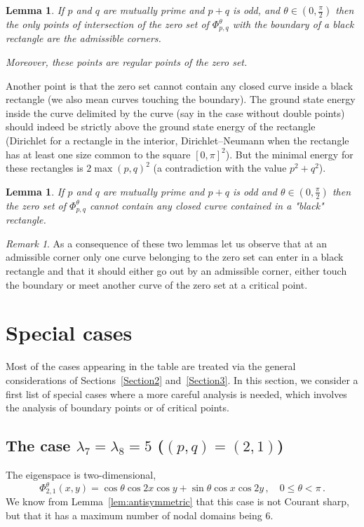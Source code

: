 \documentclass[a4paper,reqno,11pt]{amsart}
\newtheorem{lemma}[thm]{Lemma}
\theoremstyle{remark}
\newtheorem{remark}[thm]{Remark}
\theoremstyle{definition}
\numberwithin{equation}{section}
\begin{document}
\begin{lemma}
\label{lemma5.6}
If $p$ and $q$ are mutually prime and $p+q$ is odd, and 
$\theta \in (0,\frac \pi 2)$ then the only points of intersection of  the 
zero set of $\Phi_{p,q}^\theta$ with the boundary of a black rectangle are 
the admissible corners.

Moreover, these points are regular points of the zero set.
\end{lemma}
 
Another point is that the zero set cannot contain any closed curve inside a 
black rectangle (we also mean curves touching the boundary). The ground state 
energy inside the curve delimited by the curve (say in the case without double 
points) should indeed be strictly above the ground state energy of the 
rectangle (Dirichlet for a rectangle in the interior, Dirichlet--Neumann when 
the rectangle has at least one size common to the square $[0,\pi]^2$). But the 
minimal energy for these rectangles is $2 \max (p,q)^2 $ (a contradiction with 
the value $p^2+q^2$).

\begin{lemma}
\label{lemma5.7}
If $p$ and $q$ are mutually prime and $p+q$ is odd and 
$\theta \in (0,\frac \pi 2)$ then the zero set of $\Phi_{p,q}^\theta$ 
cannot contain any closed curve contained in a "black" rectangle.
\end{lemma}

\begin{remark}
As a consequence of these two lemmas let us observe that at an admissible corner 
only one curve belonging to the zero set can enter in a black rectangle  and 
that it should either go out  by an admissible corner, either  touch the 
boundary or meet another curve of the zero set at a critical point.
\end{remark}

\section{Special cases}
\label{Section6}
Most of the cases appearing in the table are treated via the general 
considerations of Sections~\ref{Section2} and~\ref{Section3}.  In this section, 
we consider a first list of special cases where a more careful analysis is 
needed, which  involves the analysis of boundary points or of critical points.

\subsection{The case $\lambda_7=\lambda_8=5$ ($(p,q)=(2,1)$)}
The eigenspace is two-dimensional,
\begin{equation}
\label{eq:psi21}
\Phi_{2,1}^{\theta}(x,y)=\cos\theta\cos2x\cos y 
+ \sin\theta\cos x\cos 2y\,,\quad 0\leq \theta<\pi\,.
\end{equation}
We know from Lemma~\ref{lem:antisymmetric} that this case is not Courant sharp, 
but that it has a maximum number of nodal domains being $6$.
\end{document}
